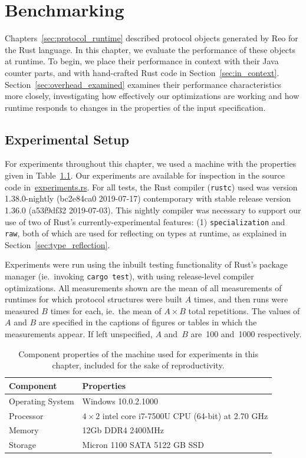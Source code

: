 \chapter{Benchmarking}
\label{sec:benchmarking}

Chapters~\ref{sec:protocol_runtime} described protocol objects generated by Reo for the Rust language. In this chapter, we evaluate the performance of these objects at runtime. To begin, we place their performance in context with their Java counter parts, and with hand-crafted Rust code in Section~\ref{sec:in_context}. Section~\ref{sec:overhead_examined} examines their performance characteristics more closely, investigating how effectively our optimizations are working and how runtime responds to changes in the properties of the input specification.

\section{Experimental Setup}
For experiments throughout this chapter, we used a machine with the properties given in Table~\ref{tab:nomad}. Our experiments are available for inspection in the source code in~\url{experiments.rs}. For all tests, the Rust compiler (\texttt{rustc}) used was version 1.38.0-nightly (bc2e84ca0 2019-07-17) contemporary with stable release version 1.36.0 (a53f9df32 2019-07-03). This nightly compiler was necessary to support our use of two of Rust's currently-experimental features: (1) \texttt{specialization} and \texttt{raw}, both of which are used for reflecting on types at runtime, as explained in Section~\ref{sec:type_reflection}.

Experiments were run using the inbuilt testing functionality of Rust's package manager (ie.\ invoking \texttt{cargo test}), with using release-level compiler optimizations. All measurements shown are the mean of all measurements of runtimes for which protocol structures were built $A$ times, and then runs were measured $B$ times for each, ie.\ the mean of $A\times{}B$ total repetitions. The values of $A$ and $B$ are specified in the captions of figures or tables in which the measurements appear. If left unspecified, $A$ and~$B$ are~100 and~1000 respectively.

\begin{table}[]
	\begin{tabular}{l|l}
		Component & Properties \\ \hline
		Operating System 	& Windows 10.0.2.1000 \\
		Processor	& $4\times{2}$ intel core i7-7500U CPU (64-bit) at 2.70 GHz \\
		Memory 	& 12Gb  DDR4 2400MHz \\
		Storage & Micron 1100 SATA 5122 GB SSD  \\
		
	\end{tabular}
	\caption{Component properties of the machine used for experiments in this chapter, included for the sake of reproductivity.}
	\label{tab:nomad}
\end{table}

